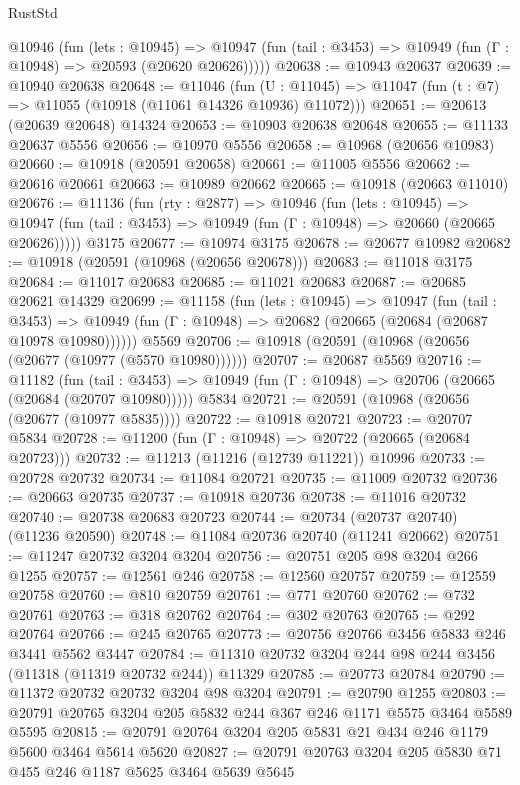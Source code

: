 \begin{lexlean}{RustStd}
\begin{coremodule}
{{{{{{{{{{{{{{{{{{{    @10946
      (fun (lets : @10945) =>
      @10947 (fun (tail : @3453) => @10949 (fun (Γ : @10948) => @20593 (@20620 @20626)))))
@20638 := @10943 @20637
@20639 := @10940 @20638
@20648 := @11046
    (fun (U : @11045) => @11047 (fun (t : @7) => @11055 (@10918 (@11061 @14326 @10936) @11072)))
@20651 := @20613 (@20639 @20648) @14324
@20653 := @10903 @20638 @20648
@20655 := @11133 @20637 @5556
@20656 := @10970 @5556
@20658 := @10968 (@20656 @10983)
@20660 := @10918 (@20591 @20658)
@20661 := @11005 @5556
@20662 := @20616 @20661
@20663 := @10989 @20662
@20665 := @10918 (@20663 @11010)
@20676 := @11136
    (fun (rty : @2877) =>
    @10946
      (fun (lets : @10945) =>
      @10947 (fun (tail : @3453) => @10949 (fun (Γ : @10948) => @20660 (@20665 @20626)))))
    @3175
@20677 := @10974 @3175
@20678 := @20677 @10982
@20682 := @10918 (@20591 (@10968 (@20656 @20678)))
@20683 := @11018 @3175
@20684 := @11017 @20683
@20685 := @11021 @20683
@20687 := @20685 @20621 @14329
@20699 := @11158
    (fun (lets : @10945) =>
    @10947
      (fun (tail : @3453) =>
      @10949 (fun (Γ : @10948) => @20682 (@20665 (@20684 (@20687 @10978 @10980))))))
    @5569
@20706 := @10918 (@20591 (@10968 (@20656 (@20677 (@10977 (@5570 @10980))))))
@20707 := @20687 @5569
@20716 := @11182
    (fun (tail : @3453) => @10949 (fun (Γ : @10948) => @20706 (@20665 (@20684 (@20707 @10980)))))
    @5834
@20721 := @20591 (@10968 (@20656 (@20677 (@10977 @5835))))
@20722 := @10918 @20721
@20723 := @20707 @5834
@20728 := @11200 (fun (Γ : @10948) => @20722 (@20665 (@20684 @20723)))
@20732 := @11213 (@11216 (@12739 @11221)) @10996
@20733 := @20728 @20732
@20734 := @11084 @20721
@20735 := @11009 @20732
@20736 := @20663 @20735
@20737 := @10918 @20736
@20738 := @11016 @20732
@20740 := @20738 @20683 @20723
@20744 := @20734 (@20737 @20740) (@11236 @20590)
@20748 := @11084 @20736 @20740 (@11241 @20662)
@20751 := @11247 @20732 @3204 @3204
@20756 := @20751 @205 @98 @3204 @266 @1255
@20757 := @12561 @246
@20758 := @12560 @20757
@20759 := @12559 @20758
@20760 := @810 @20759
@20761 := @771 @20760
@20762 := @732 @20761
@20763 := @318 @20762
@20764 := @302 @20763
@20765 := @292 @20764
@20766 := @245 @20765
@20773 := @20756 @20766 @3456 @5833 @246 @3441 @5562 @3447
@20784 := @11310 @20732 @3204 @244 @98 @244 @3456 (@11318 (@11319 @20732 @244)) @11329
@20785 := @20773 @20784
@20790 := @11372 @20732 @20732 @3204 @98 @3204
@20791 := @20790 @1255
@20803 := @20791 @20765 @3204 @205 @5832 @244 @367 @246 @1171 @5575 @3464 @5589 @5595
@20815 := @20791 @20764 @3204 @205 @5831 @21 @434 @246 @1179 @5600 @3464 @5614 @5620
@20827 := @20791 @20763 @3204 @205 @5830 @71 @455 @246 @1187 @5625 @3464 @5639 @5645
}}}}}}}}}}}}}}}}}}}
\end{coremodule}
\end{lexlean}
